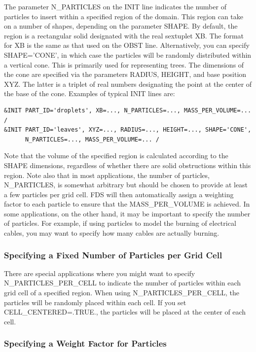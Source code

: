 \documentclass[11pt]{book}
\begin{document}
The parameter {\ct N\_PARTICLES} on the {\ct INIT} line indicates the number of particles to insert within a specified region of the domain. This region can take on a number of shapes, depending on the parameter {\ct SHAPE}. By default, the region is a rectangular solid designated with the real sextuplet {\ct XB}.
The format for {\ct XB} is the same as that used on the {\ct OBST} line. Alternatively, you can specify {\ct SHAPE='CONE'}, in which case the particles will be randomly distributed within a vertical cone. This is primarily used for representing trees. The dimensions of the cone are specified via the parameters {\ct RADIUS}, {\ct HEIGHT}, and base position {\ct XYZ}. The latter is a triplet of real numbers designating the point at the center of the base of the cone. Examples of typical {\ct INIT} lines are:
\begin{lstlisting}
&INIT PART_ID='droplets', XB=..., N_PARTICLES=..., MASS_PER_VOLUME=... /
&INIT PART_ID='leaves', XYZ=..., RADIUS=..., HEIGHT=..., SHAPE='CONE',
      N_PARTICLES=..., MASS_PER_VOLUME=... /
\end{lstlisting}
Note that the volume of the specified region is calculated according to the {\ct SHAPE} dimensions, regardless of whether there are solid obstructions within this region. Note also that in most applications, the number of particles, {\ct N\_PARTICLES}, is somewhat arbitrary but should be chosen to provide at least a few particles per grid cell. FDS will then automatically assign a weighting factor to each particle to ensure that the {\ct MASS\_PER\_VOLUME} is achieved. In some applications, on the other hand, it may be important to specify the number of particles. For example, if using particles to model the burning of electrical cables, you may want to specify how many cables are actually burning.

\subsubsection{Specifying a Fixed Number of Particles per Grid Cell}

There are special applications where you might want to specify {\ct N\_PARTICLES\_PER\_CELL} to indicate the number of particles within each grid cell of a specified region.
When using {\ct N\_PARTICLES\_PER\_CELL}, the particles will be randomly placed within each cell.  If you set {\ct CELL\_CENTERED=.TRUE.}, the particles will be placed at the center of each cell.

\subsubsection{Specifying a Weight Factor for Particles}
\end{document}
